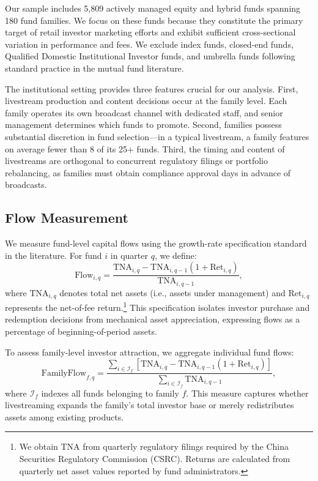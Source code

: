 \documentclass[12pt]{article}
\begin{document}
Our sample includes 5,809 actively managed equity and hybrid funds spanning 180 fund families. We focus on these funds because they constitute the primary target of retail investor marketing efforts and exhibit sufficient cross-sectional variation in performance and fees. We exclude index funds, closed-end funds, Qualified Domestic  Institutional Investor funds, and umbrella funds following standard practice in the mutual fund literature.

The institutional setting provides three features crucial for our analysis. First, livestream production and content decisions occur at the family level. Each family operates its own broadcast channel with dedicated staff, and senior management determines which funds to promote. Second, families possess substantial discretion in fund selection---in a typical livestream, a family features on average fewer than 8 of its 25+ funds. Third, the timing and content of livestreams are orthogonal to concurrent regulatory filings or portfolio rebalancing, as families must obtain compliance approval days in advance of broadcasts.

\subsection{Flow Measurement}\label{subsec:flows}

We measure fund-level capital flows using the growth-rate specification standard in the literature. For fund $i$ in quarter $q$, we define:
\begin{equation}
    \label{eq:fund_flow_twfe}
    \text{Flow}_{i,q} = \frac{\text{TNA}_{i,q} - \text{TNA}_{i,q-1}(1 + \text{Ret}_{i,q})}{\text{TNA}_{i,q-1}},
\end{equation}
where $\text{TNA}_{i,q}$ denotes total net assets (i.e., assets under management) and $\text{Ret}_{i,q}$ represents the net-of-fee return.\footnote{We obtain TNA from quarterly regulatory filings required by the China Securities Regulatory Commission (CSRC). Returns are calculated from quarterly net asset values reported by fund administrators.} This specification isolates investor purchase and redemption decisions from mechanical asset appreciation, expressing flows as a percentage of beginning-of-period assets.

To assess family-level investor attraction, we aggregate individual fund flows:
\begin{equation}
    \label{eq:family_flow}
    \text{FamilyFlow}_{f,q} = \frac{\sum_{i \in \mathcal{I}_f} \left[\text{TNA}_{i,q} - \text{TNA}_{i,q-1}(1 + \text{Ret}_{i,q})\right]}{\sum_{i \in \mathcal{I}_f} \text{TNA}_{i,q-1}},
\end{equation}
where $\mathcal{I}_f$ indexes all funds belonging to family $f$. This measure captures whether livestreaming expands the family's total investor base or merely redistributes assets among existing products.
\end{document}
